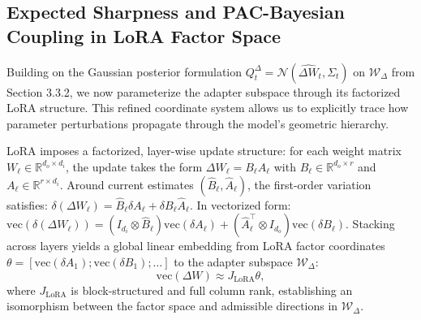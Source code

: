 \documentclass{article} %
\begin{document}
\subsection{Expected Sharpness and PAC-Bayesian Coupling in LoRA Factor Space}

Building on the Gaussian posterior formulation $Q_t^{\Delta} = \mathcal{N}(\hat{\Delta W}_t, \Sigma_t)$ on $\mathcal{W}_\Delta$ from Section 3.3.2, we now parameterize the adapter subspace through its factorized LoRA structure. This refined coordinate system allows us to explicitly trace how parameter perturbations propagate through the model's geometric hierarchy.


LoRA imposes a factorized, layer-wise update structure: for each weight matrix $W_\ell \in \mathbb{R}^{d_o \times d_i}$, the update takes the form $\Delta W_\ell = B_\ell A_\ell$ with $B_\ell \in \mathbb{R}^{d_o \times r}$ and $A_\ell \in \mathbb{R}^{r \times d_i}$. Around current estimates $(\hat{B}_\ell, \hat{A}_\ell)$, the first-order variation satisfies:
$
\delta(\Delta W_\ell) = \hat{B}_\ell \delta A_\ell + \delta B_\ell \hat{A}_\ell.
$
In vectorized form:
$
\mathrm{vec}(\delta(\Delta W_\ell)) = (I_{d_i} \otimes \hat{B}_\ell)\mathrm{vec}(\delta A_\ell) + (\hat{A}_\ell^\top \otimes I_{d_o})\mathrm{vec}(\delta B_\ell).
$
Stacking across layers yields a global linear embedding from LoRA factor coordinates $\theta = [\mathrm{vec}(\delta A_1); \mathrm{vec}(\delta B_1); \dots]$ to the adapter subspace $\mathcal{W}_\Delta$:
\[
\mathrm{vec}(\Delta W) \approx J_{\mathrm{LoRA}} \theta,
\]
where $J_{\mathrm{LoRA}}$ is block-structured and full column rank, establishing an isomorphism between the factor space and admissible directions in $\mathcal{W}_\Delta$.
\end{document}
